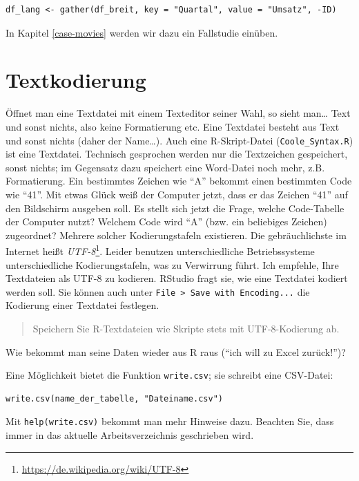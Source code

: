 \documentclass[12pt,ngerman,]{book}
\let\rmarkdownfootnote\footnote%
\def\footnote{\protect\rmarkdownfootnote}
\theoremstyle{definition}
\theoremstyle{definition}
\theoremstyle{remark}
\begin{document}
\begin{verbatim}
df_lang <- gather(df_breit, key = "Quartal", value = "Umsatz", -ID)
\end{verbatim}

In Kapitel \ref{case-movies} werden wir dazu ein Fallstudie einüben.

\section{Textkodierung}\label{textkodierung}

Öffnet man eine Textdatei mit einem Texteditor seiner Wahl, so sieht
man\ldots{} Text und sonst nichts, also keine Formatierung etc. Eine
Textdatei besteht aus Text und sonst nichts (daher der Name\ldots{}).
Auch eine R-Skript-Datei (\texttt{Coole\_Syntax.R}) ist eine Textdatei.
Technisch gesprochen werden nur die Textzeichen gespeichert, sonst
nichts; im Gegensatz dazu speichert eine Word-Datei noch mehr, z.B.
Formatierung. Ein bestimmtes Zeichen wie ``A'' bekommt einen bestimmten
Code wie ``41''. Mit etwas Glück weiß der Computer jetzt, dass er das
Zeichen ``41'' auf den Bildschirm ausgeben soll. Es stellt sich jetzt
die Frage, welche Code-Tabelle der Computer nutzt? Welchem Code wird
``A'' (bzw. ein beliebiges Zeichen) zugeordnet? Mehrere solcher
Kodierungstafeln existieren. Die gebräuchlichste im Internet heißt
\emph{UTF-8}\footnote{\url{https://de.wikipedia.org/wiki/UTF-8}}. Leider
benutzen unterschiedliche Betriebssysteme unterschiedliche
Kodierungstafeln, was zu Verwirrung führt. Ich empfehle, Ihre
Textdateien als UTF-8 zu kodieren. RStudio fragt sie, wie eine Textdatei
kodiert werden soll. Sie können auch unter
\texttt{File\ \textgreater{}\ Save\ with\ Encoding...} die Kodierung
einer Textdatei festlegen.

\begin{quote}
Speichern Sie R-Textdateien wie Skripte stets mit UTF-8-Kodierung ab.
\end{quote}

Wie bekommt man seine Daten wieder aus R raus (``ich will zu Excel
zurück!'')?

Eine Möglichkeit bietet die Funktion \texttt{write.csv}; sie schreibt
eine CSV-Datei:

\begin{verbatim}
write.csv(name_der_tabelle, "Dateiname.csv")
\end{verbatim}

Mit \texttt{help(write.csv)} bekommt man mehr Hinweise dazu. Beachten
Sie, dass immer in das aktuelle Arbeitsverzeichnis geschrieben wird.
\end{document}

